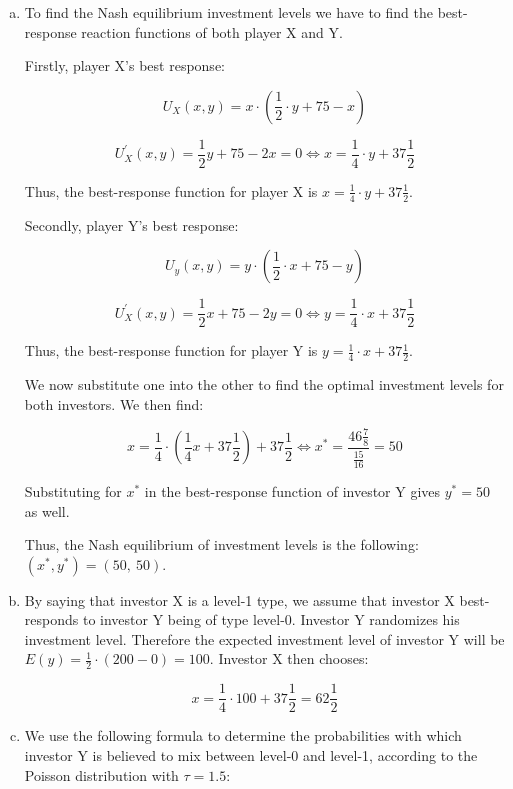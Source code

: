 \documentclass[a4paper]{article}
\begin{document}
\begin{enumerate}[(a)]
\item
To find the Nash equilibrium investment levels we have to find the
best-response reaction functions of both player X and Y.

Firstly, player X's best response:

\[U_{X}\left( x,y \right) = x \cdot \left( \frac{1}{2} \cdot y + 75 - x \right)\]

\[U_{X}^{'}\left( x,y \right) = \frac{1}{2}y + 75 - 2x = 0 \Leftrightarrow x = \frac{1}{4} \cdot y + 37\frac{1}{2}\]

Thus, the best-response function for player X is
\(x = \frac{1}{4} \cdot y + 37\frac{1}{2}\).

Secondly, player Y's best response:

\[U_{y}\left( x,y \right) = y \cdot \left( \frac{1}{2} \cdot x + 75 - y \right)\]

\[U_{X}^{'}\left( x,y \right) = \frac{1}{2}x + 75 - 2y = 0 \Leftrightarrow y = \frac{1}{4} \cdot x + 37\frac{1}{2}\]

Thus, the best-response function for player Y is
\(y = \frac{1}{4} \cdot x + 37\frac{1}{2}\).

We now substitute one into the other to find the optimal investment
levels for both investors. We then find:

\[x = \frac{1}{4} \cdot \left( \frac{1}{4}x + 37\frac{1}{2} \right) + 37\frac{1}{2} \iff x^{*} = \frac{46\frac{7}{8}}{\frac{15}{16}} = 50\]

Substituting for \(x^{*}\) in the best-response function of investor Y gives
\(y^{*} = 50\) as well.

Thus, the Nash equilibrium of investment levels is the following:
\(\left( x^{*},y^{*} \right) = (50,\ 50)\).

\item
By saying that investor X is a level-1 type, we assume that investor
X best-responds to investor Y being of type level-0. Investor Y
randomizes his investment level. Therefore the expected investment level
of investor Y will be
\(E(y) = \frac{1}{2} \cdot \left( 200 - 0 \right) = 100\). Investor X
then chooses:

\[x = \frac{1}{4} \cdot 100 + 37\frac{1}{2} = 62\frac{1}{2}\]

\item
We use the following formula to determine the probabilities with
which investor Y is believed to mix between level-0 and level-1,
according to the Poisson distribution with \(\tau = 1.5\):


\end{enumerate}
\end{document}
